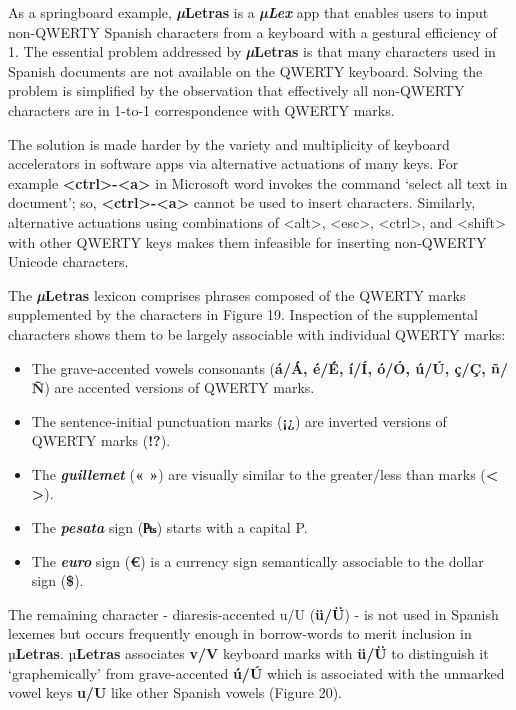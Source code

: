 As a springboard example, \textbf{\emph{µ}Letras} is a
\emph{\textbf{µLex}} app that enables users to input non-QWERTY Spanish
characters from a keyboard with a gestural efficiency of 1. The
essential problem addressed by \textbf{\emph{µ}Letras} is that many
characters used in Spanish documents are not available on the QWERTY
keyboard. Solving the problem is simplified by the observation that
effectively all non-QWERTY characters are in 1-to-1 correspondence with
QWERTY marks.

The solution is made harder by the variety and multiplicity of keyboard
accelerators in software apps via alternative actuations of many keys.
For example
\textbf{\textless ctrl\textgreater-\textless a\textgreater{}} in
Microsoft word invokes the command `select all text in document'; so,
\textbf{\textless ctrl\textgreater-\textless a\textgreater{}} cannot be
used to insert characters. Similarly, alternative actuations using
combinations of \textless alt\textgreater, \textless esc\textgreater,
\textless ctrl\textgreater, and \textless shift\textgreater{} with other
QWERTY keys makes them infeasible for inserting non-QWERTY Unicode
characters.

The \textbf{\emph{µ}Letras} lexicon comprises phrases composed of the
QWERTY marks supplemented by the characters in Figure 19. Inspection of
the supplemental characters shows them to be largely associable with
individual QWERTY marks:

\begin{itemize}
\item
  The grave-accented vowels consonants (\textbf{á/Á, é/É, í/Í, ó/Ó, ú/Ú,
  ç/Ç, ñ/Ñ}) are accented versions of QWERTY marks.
\item
  The sentence-initial punctuation marks (\textbf{¡¿}) are inverted
  versions of QWERTY marks (\textbf{!?}).
\item
  The \emph{\textbf{guillemet}} (\textbf{« »}) are visually similar to
  the greater/less than marks (\textbf{\textless{} \textgreater{}}).
\item
  The \emph{\textbf{pesata}} sign (\textbf{₧}) starts with a capital P.
\item
  The \emph{\textbf{euro}} sign (\textbf{€}) is a currency sign
  semantically associable to the dollar sign (\textbf{\$}).
\end{itemize}

The remaining character - diaresis-accented u/U (\textbf{ü/Ü}) - is not
used in Spanish lexemes but occurs frequently enough in borrow-words to
merit inclusion in µ\textbf{Letras}. µ\textbf{Letras} associates
\textbf{v/V} keyboard marks with \textbf{ü/Ü} to distinguish it
`graphemically' from grave-accented \textbf{ú/Ú} which is associated
with the unmarked vowel keys \textbf{u/U} like other Spanish vowels
(Figure 20).

